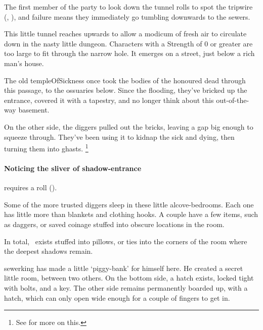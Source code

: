 The first member of the party to look down the tunnel rolls to spot the tripwire (, \tn[8]), and failure means they immediately go tumbling downwards to the sewers.


This little tunnel reaches upwards to allow a modicum of fresh air to circulate down in the nasty little dungeon.
Characters with a Strength of 0 or greater are too large to fit through the narrow hole.
It emerges on a street, just below a rich man's house.



\begin{exampletext}
  The old \gls{templeOfSickness} once took the bodies of the honoured dead through this passage, to the ossuaries below.
  Since the flooding, they've bricked up the entrance, covered it with a tapestry, and no longer think about this out-of-the-way basement.

  On the other side, the \glspl{digger} pulled out the bricks, leaving a gap big enough to squeeze through.
  They've been using it to kidnap the sick and dying, then turning them into ghasts.%
  \footnote{See  for more on this.}
\end{exampletext}

\paragraph{Noticing the sliver of shadow-entrance}
requires a  roll (\tn[9]).


Some of the more trusted \glspl{digger} sleep in these little alcove-bedrooms.
Each one has little more than blankets and clothing hooks.
A couple have a few items, such as daggers, or saved coinage stuffed into obscure locations in the room.

In total, \lootMedium\ exists stuffed into pillows, or ties into the corners of the room where the deepest shadows remain.


\Gls{sewerking} has made a little `piggy-bank' for himself here.
He created a secret little room, between two others.
On the bottom side, a hatch exists, locked tight with bolts, and a key.
The other side remains permanently boarded up, with a hatch, which can only open wide enough for a couple of fingers to get in.

